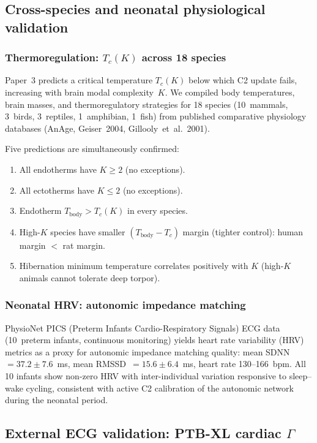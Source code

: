 \documentclass[aps,pre,twocolumn,superscriptaddress,floatfix]{revtex4-2}
\begin{document}
\subsection{Cross-species and neonatal physiological validation}
\label{sec:cross-species}

\subsubsection{Thermoregulation: $T_c(K)$ across 18 species}

Paper~3 predicts a critical temperature
$T_c(K)$ below which C2 update fails,
increasing with brain modal complexity~$K$.
We compiled body temperatures, brain masses, and
thermoregulatory strategies for 18 species
(10~mammals, 3~birds, 3~reptiles, 1~amphibian, 1~fish)
from published comparative physiology databases
(AnAge, Geiser~2004, Gillooly~et~al.~2001).

Five predictions are simultaneously confirmed:
\begin{enumerate}
  \item All endotherms have $K \geq 2$ (no exceptions).
  \item All ectotherms have $K \leq 2$ (no exceptions).
  \item Endotherm $T_{\text{body}} > T_c(K)$ in every species.
  \item High-$K$ species have smaller $(T_{\text{body}} - T_c)$
    margin (tighter control): human margin $< $ rat margin.
  \item Hibernation minimum temperature correlates positively
    with $K$ (high-$K$ animals cannot tolerate deep torpor).
\end{enumerate}

\subsubsection{Neonatal HRV: autonomic impedance matching}

PhysioNet PICS (Preterm Infants Cardio-Respiratory
Signals) ECG data (10~preterm infants, continuous
monitoring) yields heart rate variability (HRV) metrics
as a proxy for autonomic impedance matching quality:
mean SDNN~$= 37.2 \pm 7.6$~ms, mean RMSSD~$= 15.6
\pm 6.4$~ms, heart rate 130--166~bpm.
All 10 infants show non-zero HRV with inter-individual
variation responsive to sleep--wake cycling,
consistent with active C2 calibration of the autonomic
network during the neonatal period.


\subsection{External ECG validation: PTB-XL cardiac $\Gamma$}
\label{sec:ptbxl}
\end{document}
